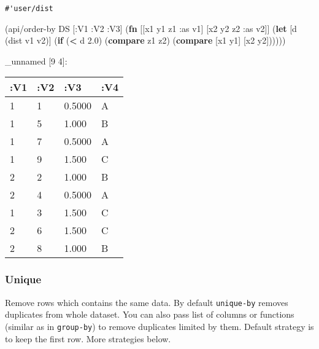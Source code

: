 \documentclass[]{article}
\newenvironment{Shaded}{\begin{snugshade}}{\end{snugshade}}
\newcommand{\KeywordTok}[1]{\textcolor[rgb]{0.13,0.29,0.53}{\textbf{#1}}}
\newcommand{\FloatTok}[1]{\textcolor[rgb]{0.00,0.00,0.81}{#1}}
\newcommand{\FunctionTok}[1]{\textcolor[rgb]{0.00,0.00,0.00}{#1}}
\newcommand{\VariableTok}[1]{\textcolor[rgb]{0.00,0.00,0.00}{#1}}
\newcommand{\BuiltInTok}[1]{#1}
\newcommand{\AttributeTok}[1]{\textcolor[rgb]{0.77,0.63,0.00}{#1}}
\newcommand{\NormalTok}[1]{#1}
\begin{document}
\begin{Shaded}
\end{Shaded}

\begin{verbatim}
#'user/dist
\end{verbatim}

\begin{Shaded}
\begin{Highlighting}[]
\NormalTok{(api/order-by DS [}\AttributeTok{:V1} \AttributeTok{:V2} \AttributeTok{:V3}\NormalTok{] (}\KeywordTok{fn}\NormalTok{ [[x1 y1 z1 }\AttributeTok{:as}\NormalTok{ v1] [x2 y2 z2 }\AttributeTok{:as}\NormalTok{ v2]]}
\NormalTok{                                 (}\KeywordTok{let}\NormalTok{ [d (dist v1 v2)]}
\NormalTok{                                   (}\KeywordTok{if}\NormalTok{ (}\KeywordTok{<}\NormalTok{ d }\FloatTok{2.0}\NormalTok{)}
\NormalTok{                                     (}\KeywordTok{compare}\NormalTok{ z1 z2)}
\NormalTok{                                     (}\KeywordTok{compare}\NormalTok{ [x1 y1] [x2 y2])))))}
\end{Highlighting}
\end{Shaded}

\_unnamed {[}9 4{]}:

\begin{longtable}[]{@{}llll@{}}
\toprule
:V1 & :V2 & :V3 & :V4\tabularnewline
\midrule
\endhead
1 & 1 & 0.5000 & A\tabularnewline
1 & 5 & 1.000 & B\tabularnewline
1 & 7 & 0.5000 & A\tabularnewline
1 & 9 & 1.500 & C\tabularnewline
2 & 2 & 1.000 & B\tabularnewline
2 & 4 & 0.5000 & A\tabularnewline
1 & 3 & 1.500 & C\tabularnewline
2 & 6 & 1.500 & C\tabularnewline
2 & 8 & 1.000 & B\tabularnewline
\bottomrule
\end{longtable}

\subsubsection{Unique}\label{unique}

Remove rows which contains the same data. By default \texttt{unique-by}
removes duplicates from whole dataset. You can also pass list of columns
or functions (similar as in \texttt{group-by}) to remove duplicates
limited by them. Default strategy is to keep the first row. More
strategies below.
\end{document}
